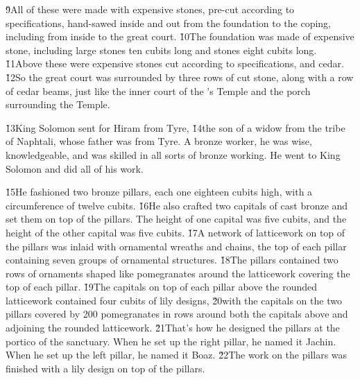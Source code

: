 \v{9}All of these were made with expensive stones, pre-cut according to specifications, hand-sawed inside and out from the foundation to the coping, including from inside to the great court. \v{10}The foundation was made of expensive stone, including large stones ten cubits long and stones eight cubits long. \v{11}Above these were expensive stones cut according to specifications, and cedar. \v{12}So the great court was surrounded by three rows of cut stone, along with a row of cedar beams, just like the inner court of the 's Temple and the porch surrounding the Temple.

\v{13}King Solomon sent for Hiram from Tyre, \v{14}the son of a widow from the tribe of Naphtali, whose father was from Tyre. A bronze worker, he was wise, knowledgeable, and was skilled in all sorts of bronze working. He went to King Solomon and did all of his work.

\v{15}He fashioned two bronze pillars, each one eighteen cubits high, with a circumference of twelve cubits. \v{16}He also crafted two capitals of cast bronze and set them on top of the pillars. The height of one capital was five cubits, and the height of the other capital was five cubits. \v{17}A network of latticework on top of the pillars was inlaid with ornamental wreaths and chains, the top of each pillar containing seven groups of ornamental structures. \v{18}The pillars contained two rows of ornaments shaped like pomegranates around the latticework covering the top of each pillar. \v{19}The capitals on top of each pillar above the rounded latticework contained four cubits of lily designs, \v{20}with the capitals on the two pillars covered by 200 pomegranates in rows around both the capitals above and adjoining the rounded latticework. \v{21}That's how he designed the pillars at the portico of the sanctuary. When he set up the right pillar, he named it Jachin. When he set up the left pillar, he named it Boaz. \v{22}The work on the pillars was finished with a lily design on top of the pillars.

